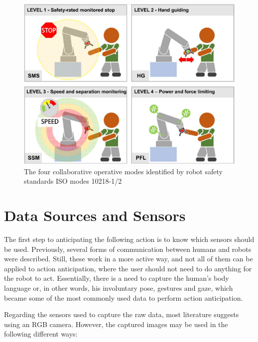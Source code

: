 \begin{figure}[h]
\centerline{\includegraphics[width=5in]{figs/iso.png}}
\caption[The four collaborative operative modes identified by robot safety standards ISO modes 10218-1/2]{The four collaborative operative modes identified by robot safety standards ISO modes 10218-1/2 \cite{Villani2018}}
\label{isonorms}
\end{figure}

\section{Data Sources and Sensors}

The first step to anticipating the following action is to know which sensors should be used. Previously, several forms of communication between humans and robots were described. Still, these work in a more active way, and not all of them can be applied to action anticipation, where the user should not need to do anything for the robot to act. Essentially, there is a need to capture the human's body language or, in other words, his involuntary pose, gestures and gaze, which became some of the most commonly used data to perform action anticipation.

Regarding the sensors used to capture the raw data, most literature suggests using an RGB camera. However, the captured images may be used in the following different ways:

